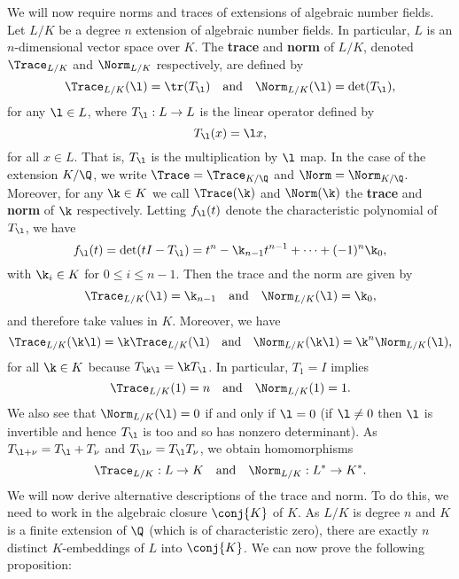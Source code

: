     We will now require norms and traces of extensions of algebraic number fields. Let $L/K$ be a degree $n$ extension of algebraic number fields. In particular, $L$ is an $n$-dimensional vector space over $K$. The \textbf{trace} and \textbf{norm} of $L/K$, denoted $\Trace_{L/K}$ and $\Norm_{L/K}$ respectively, are defined by
    \[
      \Trace_{L/K}(\l) = \tr(T_{\l}) \quad \text{and} \quad \Norm_{L/K}(\l) = \det(T_{\l}),
    \]
    for any $\l \in L$, where $T_{\l}:L \to L$ is the linear operator defined by
    \[
      T_{\l}(x) = \l x,
    \]
    for all $x \in L$. That is, $T_{\l}$ is the multiplication by $\l$ map. In the case of the extension $K/\Q$, we write $\Trace = \Trace_{K/\Q}$ and $\Norm = \Norm_{K/\Q}$. Moreover, for any $\k \in K$ we call $\Trace(\k)$ and $\Norm(\k)$ the \textbf{trace} and \textbf{norm} of $\k$ respectively. Letting $f_{\l}(t)$ denote the characteristic polynomial of $T_{\l}$, we have
    \[
      f_{\l}(t) = \det(tI-T_{\l}) = t^{n}-\k_{n-1}t^{n-1}+\cdots+(-1)^{n}\k_{0},
    \]
    with $\k_{i} \in K$ for $0 \le i \le n-1$. Then the trace and the norm are given by
    \begin{equation}\label{equ:trace_and_norm_characteristic_polynomial}
      \Trace_{L/K}(\l) = \k_{n-1} \quad \text{and} \quad \Norm_{L/K}(\l) = \k_{0},
    \end{equation}
    and therefore take values in $K$. Moreover, we have
    \[
      \Trace_{L/K}(\k\l) = \k\Trace_{L/K}(\l) \quad \text{and} \quad \Norm_{L/K}(\k\l) = \k^{n}\Norm_{L/K}(\l),
    \]
    for all $\k \in K$ because $T_{\k\l} = \k T_{\l}$. In particular, $T_{1} = I$ implies
    \[
      \Trace_{L/K}(1) = n \quad \text{and} \quad \Norm_{L/K}(1) = 1.
    \]
    We also see that $\Norm_{L/K}(\l) = 0$ if and only if $\l = 0$ (if $\l \neq 0$ then $\l$ is invertible and hence $T_{\l}$ is too and so has nonzero determinant). As $T_{\l+\nu} = T_{\l}+T_{\nu}$ and $T_{\l \nu} = T_{\l}T_{\nu}$, we obtain homomorphisms 
    \[
      \Trace_{L/K}:L \to K \quad \text{and} \quad \Norm_{L/K}:L^{\ast} \to K^{\ast}.
    \]
    We will now derive alternative descriptions of the trace and norm. To do this, we need to work in the algebraic closure $\conj{K}$ of $K$. As $L/K$ is degree $n$ and $K$ is a finite extension of $\Q$ (which is of characteristic zero), there are exactly $n$ distinct $K$-embeddings of $L$ into $\conj{K}$. We can now prove the following proposition:

